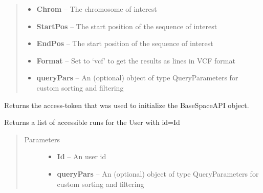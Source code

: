 \documentclass[letterpaper,10pt,english]{sphinxmanual}
\begin{document}
\begin{fulllineitems}
\begin{fulllineitems}
\begin{quote}
\begin{description}
\begin{itemize}
\item {} 
\textbf{Chrom} -- The chromosome of interest

\item {} 
\textbf{StartPos} -- The start position of the sequence of interest

\item {} 
\textbf{EndPos} -- The start position of the sequence of interest

\item {} 
\textbf{Format} -- Set to `vcf' to get the results as lines in VCF format

\item {} 
\textbf{queryPars} -- An (optional) object of type QueryParameters for custom sorting and filtering

\end{itemize}

\end{description}\end{quote}

\end{fulllineitems}


\begin{fulllineitems}
\label{Available modules:BaseSpacePy.api.BaseSpaceAPI.BaseSpaceAPI.getAccessToken}
Returns the access-token that was used to initialize the BaseSpaceAPI object.

\end{fulllineitems}


\begin{fulllineitems}
\label{Available modules:BaseSpacePy.api.BaseSpaceAPI.BaseSpaceAPI.getAccessibleRunsByUser}
Returns a list of accessible runs for the User with id=Id
\begin{quote}\begin{description}
\item[{Parameters}] \leavevmode\begin{itemize}
\item {} 
\textbf{Id} -- An user id

\item {} 
\textbf{queryPars} -- An (optional) object of type QueryParameters for custom sorting and filtering


\end{itemize}
\end{description}
\end{quote}
\end{fulllineitems}
\end{fulllineitems}
\end{document}
